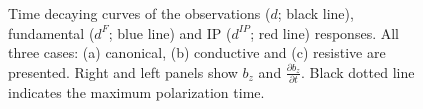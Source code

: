 \documentclass[extra,mreferee]{gji}
\newcommand{\dip}{d^{IP}}
\begin{document}
\begin{figure}
  \caption{Time decaying curves of the observations  ($d$; black line), fundamental ($d^F$; blue line) and IP ($\dip$; red line) responses. All three cases: (a) canonical, (b) conductive and (c) resistive are presented. Right and left panels show $b_z$ and $\frac{\partial b_z}{\partial t}$. Black dotted line indicates the maximum polarization time.}
  \label{F:Three_IPresp}
\end{figure}
\end{document}
